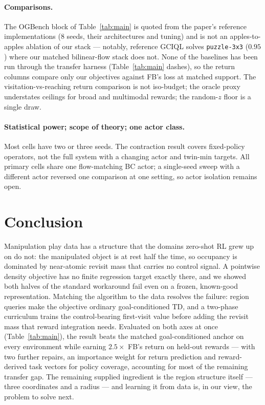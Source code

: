\documentclass{article}
\begin{document}
\paragraph{Comparisons.}
The OGBench block of Table~\ref{tab:main} is quoted from the paper's reference
implementations ($8$ seeds, their architectures and tuning) and is not an
apples-to-apples ablation of our stack --- notably, reference GCIQL solves
\texttt{puzzle-3x3} ($0.95$) where our matched bilinear-flow stack does not.
None of the baselines has been run through the transfer harness
(Table~\ref{tab:main} dashes), so the return columns compare only our
objectives against FB's loss at matched support. The visitation-vs-reaching
return comparison is not iso-budget; the oracle proxy understates ceilings for
broad and multimodal rewards; the random-$z$ floor is a single draw.

\paragraph{Statistical power; scope of theory; one actor class.}
Most cells have two or three seeds. The contraction result covers fixed-policy
operators, not the full system with a changing actor and twin-min targets. All
primary cells share one flow-matching BC actor; a single-seed sweep with a
different actor reversed one comparison at one setting, so actor isolation
remains open.

\section{Conclusion}
\label{sec:conclusion}

Manipulation play data has a structure that the domains zero-shot RL grew up on
do not: the manipulated object is at rest half the time, so occupancy is
dominated by near-atomic revisit mass that carries no control signal. A
pointwise density objective has no finite regression target exactly there, and
we showed both halves of the standard workaround fail even on a frozen,
known-good representation. Matching the algorithm to the data resolves the
failure: region queries make the objective ordinary goal-conditioned TD, and a
two-phase curriculum trains the control-bearing first-visit value before
adding the revisit mass that reward integration needs. Evaluated on both axes
at once (Table~\ref{tab:main}), the result beats the matched goal-conditioned
anchor on every environment while earning $2.5\times$ FB's return on held-out
rewards --- with two further repairs, an importance weight for return
prediction and reward-derived task vectors for policy coverage, accounting for
most of the remaining transfer gap. The remaining supplied ingredient is the
region structure itself --- three coordinates and a radius --- and learning it
from data is, in our view, the problem to solve next.
\end{document}
